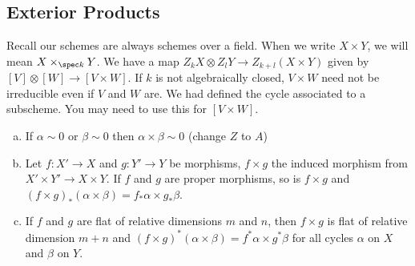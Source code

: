 \subsection{Exterior Products}


Recall our schemes are always schemes over a field. When we write $X \times Y$, we will mean $X \times_{\spec k} Y$. We have a map $Z_k X \otimes Z_l Y \to Z_{k+l}(X \times Y)$ given by $[V] \otimes [W] \to [V \times W]$. If $k$ is not algebraically closed, $V \times W$ need not be irreducible even if $V$ and $W$ are. We had defined the cycle associated to a subscheme. You may need to use this for $[V \times W]$. 


\begin{prop} \hfill
\begin{enumerate}[(a)]
\item If $\alpha \sim 0$ or $\beta \sim 0$ then $\alpha \times \beta \sim 0$ (change $Z$ to $A$)
\item Let $f: X' \to X$ and $g: Y' \to Y$ be morphisms, $f \times g$ the induced morphism from $X' \times Y' \to X \times Y$. If $f$ and $g$ are proper morphisms, so is $f \times g$ and $(f \times g)_*(\alpha \times \beta)= f_*\alpha \times g_*\beta$. 
\item If $f$ and $g$ are flat of relative dimensions $m$ and $n$, then $f \times g$ is flat of relative dimension $m+n$ and $(f\times g)^*(\alpha \times \beta)=f^*\alpha \times g^*\beta$ for all cycles $\alpha$ on $X$ and $\beta$ on $Y$. 
\end{enumerate}
\end{prop}
